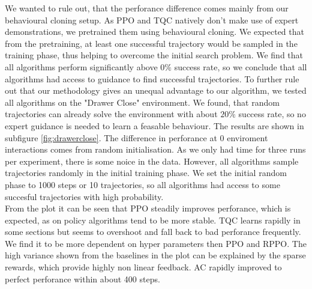 We wanted to rule out, that the perforance difference comes mainly from our behavioural cloning setup. As PPO and TQC natively don't make use of expert demonstrations, 
we pretrained them using behavioural cloning. We expected that from the pretraining, at least one successful trajectory would be sampled in the training phase, thus 
helping to overcome the initial search problem. We find that all algorithms perform significantly above $0 \%$ success rate, so we conclude that all algorithms had 
access to guidance to find successful trajectories. To further rule out that our methodology gives an unequal advantage to our algorithm, we tested all algorithms on the 
"Drawer Close" environment. We found, that random trajectories can already solve the environment with about $20 \%$ success rate, so no expert guidance is needed to learn a feasable behaviour. 
The results are shown in subfigure \ref{fig:drawerclose}. The difference in perforance at 0 enviroment interactions comes from random initialisation. As we only had time for three runs per 
experiment, there is some noice in the data. However, all algorithms sample trajectories randomly in the initial training phase. We set the initial random phase to 
1000 steps or 10 trajectories, so all algorithms had access to some succesful trajectories with high probability. \\
From the plot it can be seen that PPO steadily improves perforance, which is expected, as on policy algorithms tend to be more stable. 
TQC learns rapidly in some sections but seems to overshoot and fall back to bad perforance frequently.  
We find it to be more dependent on hyper parameters then PPO and RPPO. 
The high variance shown from the baselines in the plot can be explained by the sparse rewards, which provide highly non linear feedback. 
AC rapidly improved to perfect perforance within about 400 steps. \\


